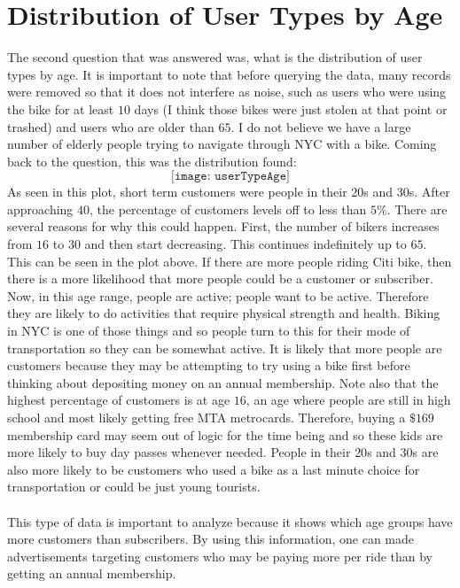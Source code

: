 \documentclass{article}
\begin{document}
\section{Distribution of User Types by Age}
The second question that was answered was, what is the distribution of user types by age. It is important to note that before querying the data, many records were removed so that it does not interfere as noise, such as users who were using the bike for at least $10$ days (I think those bikes were just stolen at that point or trashed) and users who are older than $65$. I do not believe we have a large number of elderly people trying to navigate through NYC with a bike. Coming back to the question, this was the distribution found: 
$$ \texttt{[image: userTypeAge]} $$ \newpage
As seen in this plot, short term customers were people in their $20$s and $30$s. After approaching $40$, the percentage of customers levels off to less than $5\%$. There are several reasons for why this could happen. First, the number of bikers increases from $16$ to $30$ and then start decreasing. This continues indefinitely up to $65$. This can be seen in the plot above. If there are more people riding Citi bike, then there is a more likelihood that more people could be a customer or subscriber. Now, in this age range, people are active; people want to be active. Therefore they are likely to do activities that require physical strength and health. Biking in NYC is one of those things and so people turn to this for their mode of transportation so they can be somewhat active. It is likely that more people are customers because they may be attempting to try using a bike first before thinking about depositing money on an annual membership. Note also that the highest percentage of customers is at age $16$, an age where people are still in high school and most likely getting free MTA metrocards. Therefore, buying a $\$169$ membership card may seem out of logic for the time being and so these kids are more likely to buy day passes whenever needed. 
People in their $20$s and $30$s are also more likely to be customers who used a bike as a last minute choice for transportation or could be just young tourists. \\~\\

This type of data is important to analyze because it shows which age groups have more customers than subscribers. By using this information, one can made advertisements targeting customers who may be paying more per ride than by getting an annual membership. 
\newpage
\end{document}
